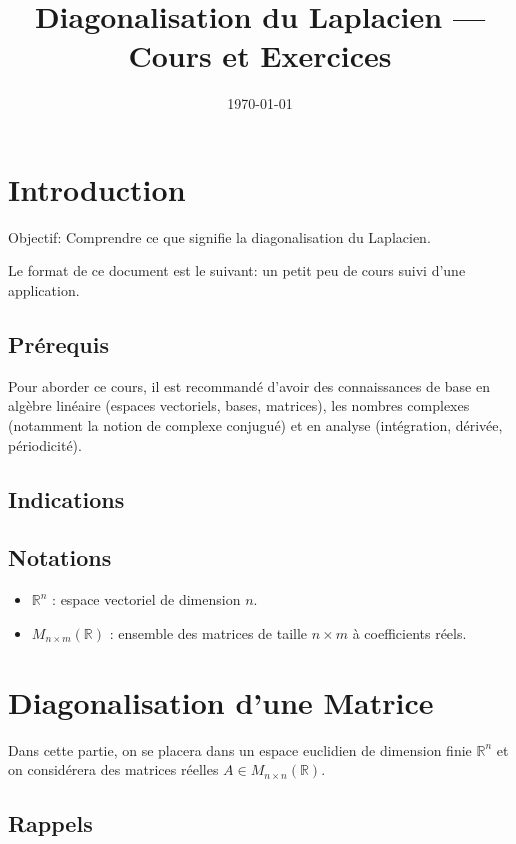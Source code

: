 \documentclass[11pt,a4paper]{article}
\title{Diagonalisation du Laplacien — Cours et Exercices}
\author{
}
\date{\today}
\numberwithin{equation}{section}
\theoremstyle{plain}
\theoremstyle{definition}
\theoremstyle{remark}
\newcommand{\R}{\mathbb{R}}
\begin{document}
\maketitle
\tableofcontents

\section{Introduction}
Objectif: Comprendre ce que signifie la diagonalisation du Laplacien.

Le format de ce document est le suivant: un petit peu de cours suivi d'une application.

\subsection{Prérequis}
Pour aborder ce cours, il est recommandé d'avoir des connaissances de base en algèbre linéaire (espaces vectoriels, bases, matrices), les nombres complexes (notamment la notion de complexe conjugué) et en analyse (intégration, dérivée, périodicité).

\subsection{Indications}

\subsection{Notations}

\begin{itemize}
    \item $\R^n$ : espace vectoriel de dimension $n$.
    \item $M_{n \times m}(\R)$ : ensemble des matrices de taille $n \times m$ à coefficients réels.
\end{itemize}

\section{Diagonalisation d'une Matrice}

Dans cette partie, on se placera dans un espace euclidien de dimension finie $\R^n$ et on considérera des matrices réelles $A \in M_{n \times n}(\R)$.

\subsection{Rappels}
\end{document}
